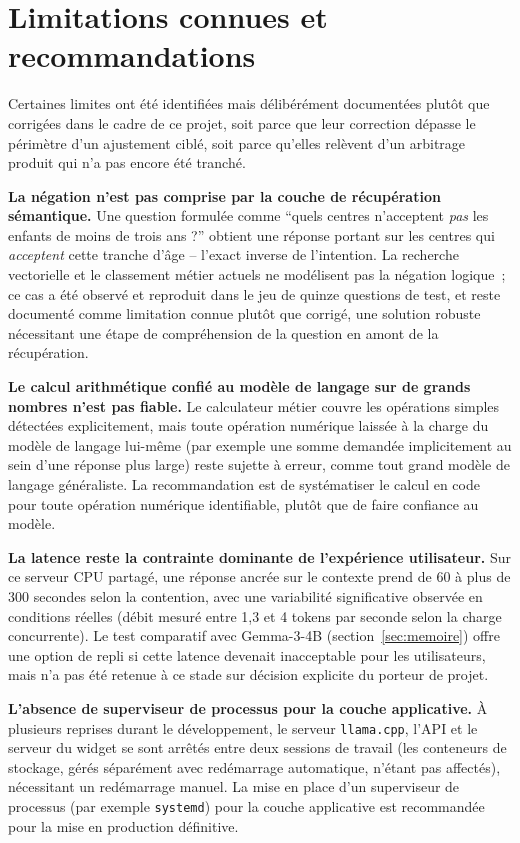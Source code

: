 \section{Limitations connues et recommandations}
\label{sec:limitations}

Certaines limites ont été identifiées mais délibérément documentées plutôt que corrigées dans le cadre de ce projet, soit parce que leur correction dépasse le périmètre d'un ajustement ciblé, soit parce qu'elles relèvent d'un arbitrage produit qui n'a pas encore été tranché.

\textbf{La négation n'est pas comprise par la couche de récupération sémantique.} Une question formulée comme ``quels centres n'acceptent \emph{pas} les enfants de moins de trois ans ?'' obtient une réponse portant sur les centres qui \emph{acceptent} cette tranche d'âge -- l'exact inverse de l'intention. La recherche vectorielle et le classement métier actuels ne modélisent pas la négation logique~; ce cas a été observé et reproduit dans le jeu de quinze questions de test, et reste documenté comme limitation connue plutôt que corrigé, une solution robuste nécessitant une étape de compréhension de la question en amont de la récupération.

\textbf{Le calcul arithmétique confié au modèle de langage sur de grands nombres n'est pas fiable.} Le calculateur métier couvre les opérations simples détectées explicitement, mais toute opération numérique laissée à la charge du modèle de langage lui-même (par exemple une somme demandée implicitement au sein d'une réponse plus large) reste sujette à erreur, comme tout grand modèle de langage généraliste. La recommandation est de systématiser le calcul en code pour toute opération numérique identifiable, plutôt que de faire confiance au modèle.

\textbf{La latence reste la contrainte dominante de l'expérience utilisateur.} Sur ce serveur CPU partagé, une réponse ancrée sur le contexte prend de 60 à plus de 300 secondes selon la contention, avec une variabilité significative observée en conditions réelles (débit mesuré entre 1,3 et 4 tokens par seconde selon la charge concurrente). Le test comparatif avec Gemma-3-4B (section~\ref{sec:memoire}) offre une option de repli si cette latence devenait inacceptable pour les utilisateurs, mais n'a pas été retenue à ce stade sur décision explicite du porteur de projet.

\textbf{L'absence de superviseur de processus pour la couche applicative.} À plusieurs reprises durant le développement, le serveur \texttt{llama.cpp}, l'API et le serveur du widget se sont arrêtés entre deux sessions de travail (les conteneurs de stockage, gérés séparément avec redémarrage automatique, n'étant pas affectés), nécessitant un redémarrage manuel. La mise en place d'un superviseur de processus (par exemple \texttt{systemd}) pour la couche applicative est recommandée pour la mise en production définitive.

